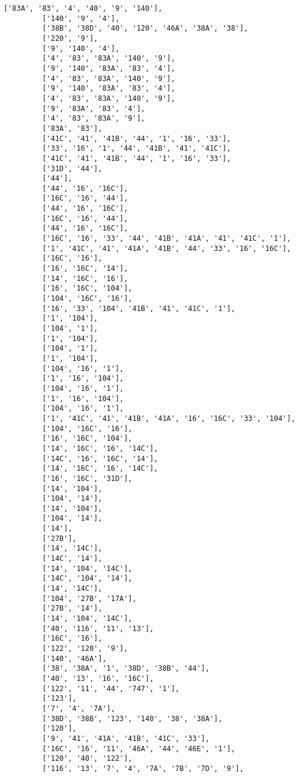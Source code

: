 \documentclass[11pt]{article}
\begin{document}
\begin{Verbatim}[commandchars=\\\{\}]
         ['83A', '83', '4', '40', '9', '140'],
         ['140', '9', '4'],
         ['38B', '38D', '40', '120', '46A', '38A', '38'],
         ['220', '9'],
         ['9', '140', '4'],
         ['4', '83', '83A', '140', '9'],
         ['9', '140', '83A', '83', '4'],
         ['4', '83', '83A', '140', '9'],
         ['9', '140', '83A', '83', '4'],
         ['4', '83', '83A', '140', '9'],
         ['9', '83A', '83', '4'],
         ['4', '83', '83A', '9'],
         ['83A', '83'],
         ['41C', '41', '41B', '44', '1', '16', '33'],
         ['33', '16', '1', '44', '41B', '41', '41C'],
         ['41C', '41', '41B', '44', '1', '16', '33'],
         ['31D', '44'],
         ['44'],
         ['44', '16', '16C'],
         ['16C', '16', '44'],
         ['44', '16', '16C'],
         ['16C', '16', '44'],
         ['44', '16', '16C'],
         ['16C', '16', '33', '44', '41B', '41A', '41', '41C', '1'],
         ['1', '41C', '41', '41A', '41B', '44', '33', '16', '16C'],
         ['16C', '16'],
         ['16', '16C', '14'],
         ['14', '16C', '16'],
         ['16', '16C', '104'],
         ['104', '16C', '16'],
         ['16', '33', '104', '41B', '41', '41C', '1'],
         ['1', '104'],
         ['104', '1'],
         ['1', '104'],
         ['104', '1'],
         ['1', '104'],
         ['104', '16', '1'],
         ['1', '16', '104'],
         ['104', '16', '1'],
         ['1', '16', '104'],
         ['104', '16', '1'],
         ['1', '41C', '41', '41B', '41A', '16', '16C', '33', '104'],
         ['104', '16C', '16'],
         ['16', '16C', '104'],
         ['14', '16C', '16', '14C'],
         ['14C', '16', '16C', '14'],
         ['14', '16C', '16', '14C'],
         ['16', '16C', '31D'],
         ['14', '104'],
         ['104', '14'],
         ['14', '104'],
         ['104', '14'],
         ['14'],
         ['27B'],
         ['14', '14C'],
         ['14C', '14'],
         ['14', '104', '14C'],
         ['14C', '104', '14'],
         ['14', '14C'],
         ['104', '27B', '17A'],
         ['27B', '14'],
         ['14', '104', '14C'],
         ['40', '116', '11', '13'],
         ['16C', '16'],
         ['122', '120', '9'],
         ['140', '46A'],
         ['38', '38A', '1', '38D', '38B', '44'],
         ['40', '13', '16', '16C'],
         ['122', '11', '44', '747', '1'],
         ['123'],
         ['7', '4', '7A'],
         ['38D', '38B', '123', '140', '38', '38A'],
         ['120'],
         ['9', '41', '41A', '41B', '41C', '33'],
         ['16C', '16', '11', '46A', '44', '46E', '1'],
         ['120', '40', '122'],
         ['116', '13', '7', '4', '7A', '7B', '7D', '9'],

\end{Verbatim}
\end{document}
